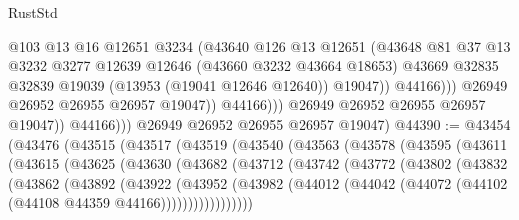 \begin{lexlean}{RustStd}
\begin{coremodule}
                                @103
                                @13
                                @16
                                @12651
                                @3234
                                (@43640
                                  @126
                                  @13
                                  @12651
                                  (@43648
                                    @81
                                    @37
                                    @13
                                    @3232
                                    @3277
                                    @12639
                                    @12646
                                    (@43660 @3232 @43664 @18653)
                                    @43669
                                    @32835
                                    @32839
                                    @19039
                                    (@13953 (@19041 @12646 @12640))
                                    @19047))
                                @44166)))
                          @26949
                          @26952
                          @26955
                          @26957
                          @19047))
                      @44166)))
                @26949
                @26952
                @26955
                @26957
                @19047))
            @44166)))
      @26949
      @26952
      @26955
      @26957
      @19047)
@44390 := @43454
    (@43476
      (@43515
        (@43517
          (@43519
            (@43540
              (@43563
                (@43578
                  (@43595
                    (@43611
                      (@43615
                        (@43625
                          (@43630
                            (@43682
                              (@43712
                                (@43742
                                  (@43772
                                    (@43802
                                      (@43832
                                        (@43862
                                          (@43892
                                            (@43922
                                              (@43952
                                                (@43982
                                                  (@44012
                                                    (@44042
                                                      (@44072
                                                        (@44102
                                                          (@44108 @44359 @44166)))))))))))))))))

\end{coremodule}
\end{lexlean}
